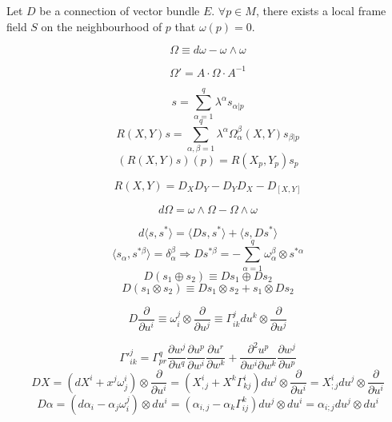 \begin{newthem} 
Let $D$ be a connection of vector bundle $E$. $\forall p \in M$, there exists a local frame field $S$ on the neighbourhood of $p$ that $\omega(p) =0$.
\end{newthem}

\begin{newdef}
\[\Omega \equiv d\omega - \omega \wedge \omega\]
\end{newdef}

\begin{newprop}
\[\Omega' = A \cdot \Omega \cdot A^{-1}\]
\end{newprop}

\begin{newdef}
\[s = \sum_{\alpha=1}^{q} \lambda^{\alpha} s_{\alpha|p}\]
\[R(X,Y)s = \sum_{\alpha,\beta=1}^{q} \lambda^{\alpha} \Omega^{\beta}_{\alpha}(X,Y)s_{\beta|p}\]
\[(R(X,Y)s)(p) = R(X_p,Y_p)s_p\]
\end{newdef}

\begin{newprop}
\[R(X,Y) = D_X D_Y - D_Y D_X -D_{[X,Y]}\]
\end{newprop}

\begin{newthem}
\[d\Omega = \omega \wedge \Omega - \Omega \wedge \omega\]
\end{newthem}

\begin{newdef}
\[d\langle s,s^* \rangle = \langle Ds,s^* \rangle + \langle s,Ds^* \rangle\]
\[\langle s_{\alpha},s^{*\beta} \rangle  = \delta^{\beta}_{\alpha}  \Rightarrow Ds^{*\beta} = -\sum_{\alpha=1}^{q} \omega^{\beta}_{\alpha} \otimes s^{*\alpha}\]
\[D(s_1 \oplus s_2) \equiv Ds_1 \oplus Ds_2\]
\[D(s_1 \otimes s_2) \equiv Ds_1 \otimes s_2 + s_1 \otimes Ds_2\]
\end{newdef}

\begin{newdef}
\[D\frac{\partial}{\partial u^i} \equiv \omega^j_i \otimes \frac{\partial}{\partial u^j} \equiv \Gamma^{j}_{ik} du^k \otimes \frac{\partial}{\partial u^j}\]
\end{newdef}

\begin{newprop}
\[\Gamma'^{j}_{ik} = \Gamma^{q}_{pr} \frac{\partial w^j}{\partial u^q} \frac{\partial u^p}{\partial w^i} \frac{\partial u^r}{\partial w^k} + \frac{\partial^2 u^p}{\partial w^i \partial w^k} \frac{\partial w^j}{\partial u^p}\]
\[DX = (dX^i + x^j \omega^i_j)\otimes \frac{\partial}{\partial u^i} = (X^i_{,j} + X^k \Gamma^{i}_{kj}) du^j \otimes \frac{\partial}{\partial u^i} = X^i_{;j}du^j \otimes \frac{\partial}{\partial u^i} \]
\[D \alpha = (d\alpha_i - \alpha_j \omega^j_i)\otimes du^i = (\alpha_{i,j} -\alpha_k \Gamma^k_{ij})du^j \otimes du^i = \alpha_{i;j} du^j \otimes du^i \]
\end{newprop}

